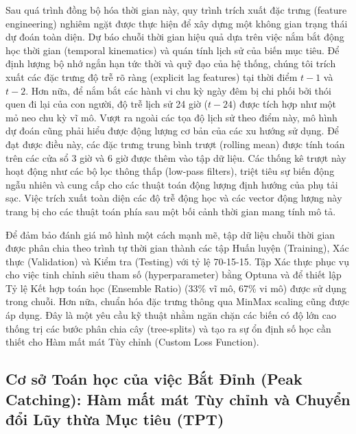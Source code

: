 \documentclass[pdflatex,sn-mathphys-num]{sn-jnl}%
\theoremstyle{thmstyleone}%
\theoremstyle{thmstyletwo}%
\theoremstyle{thmstylethree}%
\begin{document}
Sau quá trình đồng bộ hóa thời gian này, quy trình trích xuất đặc trưng (feature engineering) nghiêm ngặt được thực hiện để xây dựng một không gian trạng thái dự đoán toàn diện. Dự báo chuỗi thời gian hiệu quả dựa trên việc nắm bắt động học thời gian (temporal kinematics) và quán tính lịch sử của biến mục tiêu. Để định lượng bộ nhớ ngắn hạn tức thời và quỹ đạo của hệ thống, chúng tôi trích xuất các đặc trưng độ trễ rõ ràng (explicit lag features) tại thời điểm $t-1$ và $t-2$. Hơn nữa, để nắm bắt các hành vi chu kỳ ngày đêm bị chi phối bởi thói quen đi lại của con người, độ trễ lịch sử 24 giờ ($t-24$) được tích hợp như một mỏ neo chu kỳ vĩ mô. Vượt ra ngoài các tọa độ lịch sử theo điểm này, mô hình dự đoán cũng phải hiểu được động lượng cơ bản của các xu hướng sử dụng. Để đạt được điều này, các đặc trưng trung bình trượt (rolling mean) được tính toán trên các cửa sổ $3$ giờ và $6$ giờ được thêm vào tập dữ liệu. Các thống kê trượt này hoạt động như các bộ lọc thông thấp (low-pass filters), triệt tiêu sự biến động ngẫu nhiên và cung cấp cho các thuật toán động lượng định hướng của phụ tải sạc. Việc trích xuất toàn diện các độ trễ động học và các vector động lượng này trang bị cho các thuật toán phía sau một bối cảnh thời gian mang tính mô tả.

Để đảm bảo đánh giá mô hình một cách mạnh mẽ, tập dữ liệu chuỗi thời gian được phân chia theo trình tự thời gian thành các tập Huấn luyện (Training), Xác thực (Validation) và Kiểm tra (Testing) với tỷ lệ 70-15-15. Tập Xác thực phục vụ cho việc tinh chỉnh siêu tham số (hyperparameter) bằng Optuna và để thiết lập Tỷ lệ Kết hợp toán học (Ensemble Ratio) (33\% vĩ mô, 67\% vi mô) được sử dụng trong chuỗi. Hơn nữa, chuẩn hóa đặc trưng thông qua MinMax scaling cũng được áp dụng. Đây là một yêu cầu kỹ thuật nhằm ngăn chặn các biến có độ lớn cao thống trị các bước phân chia cây (tree-splits) và tạo ra sự ổn định số học cần thiết cho Hàm mất mát Tùy chỉnh (Custom Loss Function).



\subsection{Cơ sở Toán học của việc Bắt Đỉnh (Peak Catching): Hàm mất mát Tùy chỉnh và Chuyển đổi Lũy thừa Mục tiêu (TPT)}\label{subsec2_3}
\end{document}
